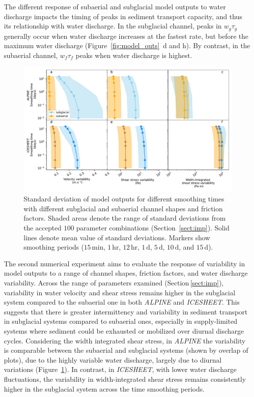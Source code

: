 \documentclass[draft]{agujournal2019}
\newcommand{\alpine}{\textit{ALPINE}}
\newcommand{\icesheet}{\textit{ICESHEET}}
\newcommand{\unit}[1]{$\mathrm{#1}$}
\begin{document}
The different response of subaerial and subglacial model outputs to water discharge impacts the timing of peaks in sediment transport capacity, and thus its  relationship with water discharge.
In the subglacial channel, peaks in $w_g\tau_g$ generally occur when water discharge increases at the fastest rate, but before the maximum water discharge (Figure~\ref{fig:model_outs}\, d and h).
By contrast, in the subaerial channel,   $w_f\tau_f$  peaks when water discharge is highest.

\begin{figure}[h]
  \centering
  \includegraphics[width=0.9\linewidth]{Fig4.pdf}
  \caption{Standard deviation of model outputs for different smoothing times with different subglacial and subaerial channel shapes and friction factors.
    Shaded areas denote the range of standard deviations from the accepted $100$ parameter combinations (Section~\ref{sect:imp}).
    Solid lines denote  mean value of standard deviations.
    Markers show smoothing periods ($15$\,\unit{min}, $1$\,\unit{hr}, $12$\,\unit{hr}, $1$\,\unit{d}, $5$\,\unit{d}, $10$\,\unit{d}, and $15$\,\unit{d}).
  }
  \label{fig:multi_run}
\end{figure}

The second numerical experiment aims to evaluate the response of variability in model outputs to a range of channel shapes, friction factors, and water discharge variability.
Across the range of parameters  examined (Section\,\ref{sect:imp}), variability in water velocity and shear stress remains higher in the subglacial system compared to the subaerial one in both \alpine{} and \icesheet{}.
This suggests that there is greater intermittency and variability in sediment transport in subglacial systems compared to subaerial ones, especially in supply-limited systems where sediment could be exhausted or mobilized over diurnal discharge cycles.
Considering the width integrated shear stress, in \alpine{} the variability is comparable between the subaerial and subglacial systems (shown by overlap of plots), due to the highly variable water discharge, largely due to diurnal variations (Figure~\ref{fig:multi_run}).
In contrast, in \icesheet{}, with lower water discharge fluctuations, the variability in width-integrated shear stress remains consistently higher in the subglacial system across the time smoothing periods.
\end{document}
